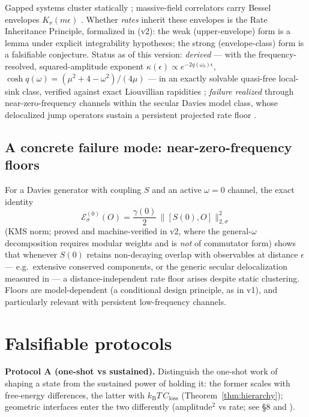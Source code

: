 \documentclass[11pt,a4paper]{article}
\theoremstyle{plain}
\theoremstyle{definition}
\theoremstyle{remark}
\newcommand{\kB}{k_{\mathrm{B}}}
\newcommand{\eps}{\epsilon}
\newcommand{\Closs}{\dot{C}_{\mathrm{loss}}}
\begin{document}
Gapped systems cluster statically \cite{HastingsKoma,NachtergaeleSims};
massive-field correlators carry Bessel envelopes $K_\nu(m\eps)$
\cite{Clustering}. Whether \emph{rates} inherit these envelopes is the Rate
Inheritance Principle, formalized in \cite{RIP} (v2): the weak
(upper-envelope) form is a lemma under explicit integrability hypotheses;
the strong (envelope-class) form is a falsifiable conjecture. Status as of
this version: \emph{derived} --- with the frequency-resolved,
squared-amplitude exponent $\kappa(\eps) \propto e^{-2q(\omega_b)\eps}$,
$\cosh q(\omega) = (\mu^2 + 4 - \omega^2)/(4\mu)$ --- in an exactly solvable
quasi-free local-sink class, verified against exact Liouvillian rapidities
\cite{HCut}; \emph{failure realized} through near-zero-frequency channels
within the secular Davies model class, whose delocalized jump operators
sustain a persistent projected rate floor \cite{Stress}.

\subsection{A concrete failure mode: near-zero-frequency floors}

For a Davies generator with coupling $S$ and an active $\omega = 0$ channel,
the exact identity
\begin{equation}
\mathcal{E}^{(0)}_\sigma(O) = \frac{\gamma(0)}{2}\,
\big\lVert [S(0), O] \big\rVert^2_{2,\sigma}
\end{equation}
(KMS norm; proved and machine-verified in \cite{DaviesCore} v2, where the
general-$\omega$ decomposition requires modular weights and is \emph{not} of
commutator form) shows that whenever $S(0)$ retains non-decaying overlap
with observables at distance $\eps$ --- e.g.\ extensive conserved components,
or the generic secular delocalization measured in \cite{Stress} --- a
distance-independent rate floor arises despite static clustering. Floors are
model-dependent (a conditional design principle, as in v1), and particularly
relevant with persistent low-frequency channels.

\section{Falsifiable protocols}\label{sec:protocols}

\textbf{Protocol A (one-shot vs sustained).} Distinguish the one-shot work
of shaping a state from the sustained power of holding it: the former scales
with free-energy differences, the latter with $\kB T\,\Closs$
(Theorem~\ref{thm:hierarchy}); geometric interfaces enter the two
differently (amplitude$^2$ vs rate; see \cite{MaintWork} \S8 and \cite{HCut}).
\end{document}
